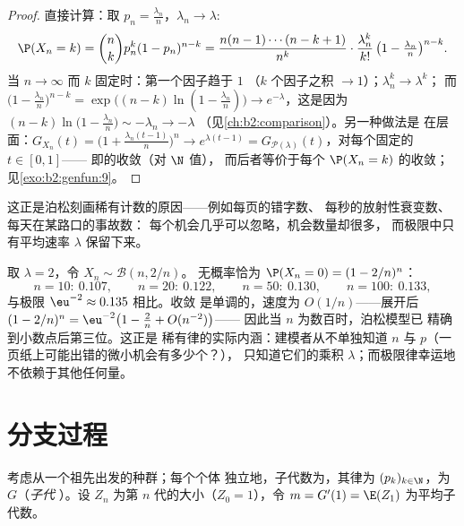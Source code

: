 \begin{proof}
直接计算：取 $p_n = \frac{\lambda_n}{n}$，$\lambda_n
\to \lambda$:
\[
\P(X_n = k)
= \binom nk p_n^k(1 - p_n)^{n-k}
= \frac{n(n-1)\cdots(n-k+1)}{n^k}\cdot
\frac{\lambda_n^k}{k!}\,
\bigl(1 - \tfrac{\lambda_n}{n}\bigr)^{n-k} .
\]
当 $n \to \infty$ 而 $k$ 固定时：第一个因子趋于 $1$
（$k$ 个因子之积 $\to 1$）；$\lambda_n^k \to \lambda^k$；
而 $\bigl(1 - \frac{\lambda_n}{n}\bigr)^{n-k} =
\exp\bigl((n-k)\ln(1 - \frac{\lambda_n}{n})\bigr) \to
e^{-\lambda}$，这是因为 $(n - k)\ln\bigl(1 - \frac{\lambda_n}{n}\bigr)
\sim -\lambda_n \to -\lambda$
（见\cref{ch:b2:comparison}）。另一种做法是
在层面：$G_{X_n}(t) = \bigl(1 +
\frac{\lambda_n(t-1)}{n}\bigr)^n \to e^{\lambda(t - 1)} =
G_{\mathcal{P}(\lambda)}(t)$，对每个固定的 $t \in [0, 1]$——
即的收敛（对 $\N$ 值），
而后者等价于每个 $\P(X_n = k)$ 的收敛；
见\cref{exo:b2:genfun:9}。
\end{proof}

\begin{remark}
这正是泊松刻画稀有计数的原因——例如每页的错字数、
每秒的放射性衰变数、每天在某路口的事故数：
每个机会几乎可以忽略，机会数量却很多，
而极限中只有平均速率 $\lambda$ 保留下来。
\end{remark}

\begin{example}\label{ex:b2:genfun:poissonnumerics}
取 $\lambda = 2$，令 $X_n \sim \mathcal B(n, 2/n)$。
无概率恰为 $\P(X_n = 0) = (1 - 2/n)^n$：
\[
n = 10:\ 0.107, \qquad
n = 20:\ 0.122, \qquad
n = 50:\ 0.130, \qquad
n = 100:\ 0.133,
\]
与极限 $\eu^{-2} \approx 0.135$ 相比。收敛
是单调的，速度为 $O(1/n)$——展开后 $(1 -
2/n)^n = \eu^{-2}\bigl(1 - \tfrac2n + O(n^{-2})\bigr)$——
因此当 $n$ 为数百时，泊松模型已
精确到小数点后第三位。这正是
稀有律的实际内涵：建模者从不单独知道 $n$ 与
$p$（一页纸上可能出错的微小机会有多少个？），
只知道它们的乘积 $\lambda$；而极限律幸运地
不依赖于其他任何量。
\end{example}

\section{分支过程}

考虑从一个祖先出发的种群；每个个体
独立地，子代数为，其律为 $(p_k)_{k
\in \N}$，为 $G$（\emph{子代
}）。设 $Z_n$ 为第 $n$ 代的大小（$Z_0 =
1$），令 $m = G'(1) = \E(Z_1)$ 为平均子代数。

